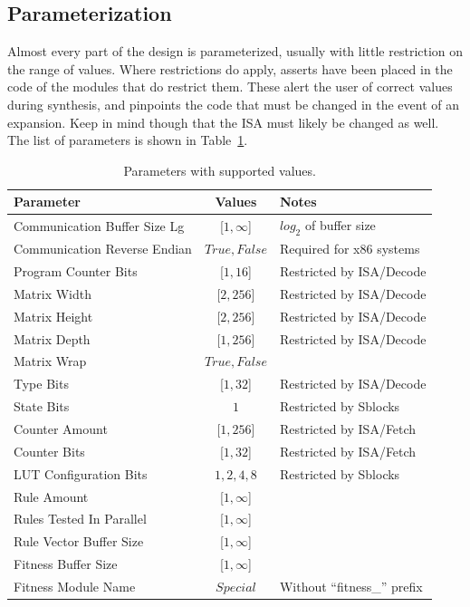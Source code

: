 \subsection{Parameterization}

Almost every part of the design is parameterized, usually with little restriction on the range of values.
Where restrictions do apply, asserts have been placed in the code of the modules that do restrict them.
These alert the user of correct values during synthesis, and pinpoints the code that must be changed in the event of an expansion.
Keep in mind though that the ISA must likely be changed as well.
The list of parameters is shown in Table~\ref{tab:parameters}.

\begin{table}[!ht]
    \renewcommand{\arraystretch}{1.3}
    \centering
    \begin{tabular}{l|c|l}
        \bfseries Parameter & \bfseries Values & \bfseries Notes \\
        \hline
        Communication Buffer Size Lg & [$1,\infty$] & $log_2$ of buffer size \\
        Communication Reverse Endian & $True,False$ & Required for x86 systems \\
        Program Counter Bits         & [$1,16$]     & Restricted by ISA/Decode \\
        Matrix Width                 & [$2,256$]    & Restricted by ISA/Decode \\
        Matrix Height                & [$2,256$]    & Restricted by ISA/Decode \\
        Matrix Depth                 & [$1,256$]    & Restricted by ISA/Decode \\
        Matrix Wrap                  & $True,False$ & \\
        Type Bits                    & [$1,32$]     & Restricted by ISA/Decode \\
        State Bits                   & $1$          & Restricted by Sblocks \\
        Counter Amount               & [$1,256$]    & Restricted by ISA/Fetch \\
        Counter Bits                 & [$1,32$]     & Restricted by ISA/Fetch \\
        LUT Configuration Bits       & $1,2,4,8$    & Restricted by Sblocks \\
        Rule Amount                  & [$1,\infty$] & \\
        Rules Tested In Parallel     & [$1,\infty$] & \\
        Rule Vector Buffer Size      & [$1,\infty$] & \\
        Fitness Buffer Size          & [$1,\infty$] & \\
        Fitness Module Name          & $Special$    & Without ``fitness\_'' prefix \\
    \end{tabular}
    \caption[Parameters.]{Parameters with supported values.}
    \label{tab:parameters}
\end{table}

